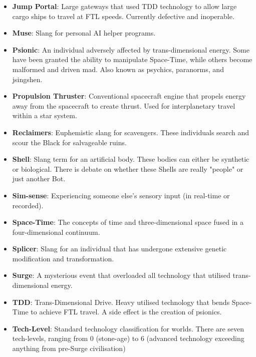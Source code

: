 \documentclass[10pt,twoside]{article}
\begin{document}
\begin{multicols}{2}
\begin{itemize}
\item \textbf{Jump Portal}: Large gateways that used TDD technology to allow large cargo ships to travel at FTL speeds. Currently defective and inoperable.

\item \textbf{Muse}: Slang for personal AI helper programs.

\item \textbf{Psionic}: An individual adversely affected by trans-dimensional energy. Some have been granted the ability to manipulate Space-Time, while others become malformed and driven mad. Also known as psychics, paranorms, and jsingshen.

\item \textbf{Propulsion Thruster}: Conventional spacecraft engine that propels energy away from the spacecraft to create thrust. Used for interplanetary travel within a star system.

\item \textbf{Reclaimers}: Euphemistic slang for scavengers. These individuals search and scour the Black for salvageable ruins.

\item \textbf{Shell}: Slang term for an artificial body. These bodies can either be synthetic or biological. There is debate on whether these Shells are really "people" or just another Bot.

\item \textbf{Sim-sense}: Experiencing someone else's sensory input (in real-time or recorded).

\item \textbf{Space-Time}: The concepts of time and three-dimensional space fused in a four-dimensional continuum.

\item \textbf{Splicer}: Slang for an individual that has undergone extensive genetic modification and transformation.

\item \textbf{Surge}: A mysterious event that overloaded all technology that utilised trans-dimensional energy.

\item \textbf{TDD}: Trans-Dimensional Drive. Heavy utilised technology that bends Space-Time to achieve FTL travel. A side effect is the creation of psionics.

\item \textbf{Tech-Level}: Standard technology classification for worlds. There are seven tech-levels, ranging from 0 (stone-age) to 6 (advanced technology exceeding anything from pre-Surge civilisation)


\end{itemize}
\end{multicols}
\end{document}

